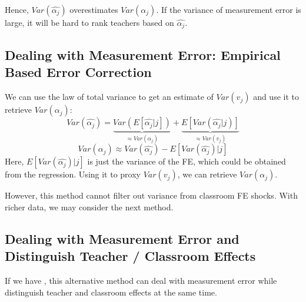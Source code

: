        Hence, $Var(\widehat{\alpha_j})$ overestimates $Var(\alpha_j)$. If the variance of measurement error is large, it will be hard to rank teachers based on $\widehat{\alpha_j}$.

    \subsection{Dealing with Measurement Error: Empirical Based Error Correction}

        We can use the law of total variance to get an estimate of $Var(v_{j})$ and use it to retrieve $Var(\alpha_j)$:
        $$Var(\widehat{\alpha_j})=\underbrace{Var(E[\widehat{\alpha_j}|j])}_{\approx Var(\alpha_j)}+\underbrace{ E[Var(\widehat{\alpha_j}|j)] }_{ \approx Var(v_{j}) }$$
        $$Var(\alpha_j)\approx Var(\widehat{\alpha_j})-E[Var(\widehat{\alpha_j})|j]$$
        Here, $E[Var(\widehat{\alpha_j})|j]$ is just the variance of the FE, which could be obtained from the regression. Using it to proxy $Var(v_j)$, we can retrieve $Var(\alpha_j)$.
        
        However, this method cannot filter out variance from classroom FE shocks. With richer data, we may consider the next method.
        
    \subsection{Dealing with Measurement Error and Distinguish Teacher / Classroom Effects}

        If we have , this alternative method can deal with measurement error while distinguish teacher and classroom effects at the same time.

